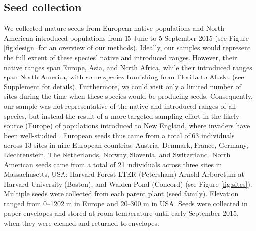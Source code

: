 \documentclass[11pt]{article}\usepackage[]{graphicx}\usepackage[]{color}
\begin{document}
	\subsection{Seed collection} 
	We collected mature seeds from European native populations and North American introduced populations from 15 June to 5 September 2015 (see Figure \ref{fig:design} for an overview of our methods).  Ideally, our samples would represent the full extent of these species' native and introduced ranges. However, their native ranges span Europe, Asia, and North Africa, while their introduced ranges span North America, with some species flourishing from Florida to Alaska (see Supplement for details). Furthermore, we could visit only a limited number of sites during the time when these species would be producing seeds. Consequently, our sample was not representative of the native and introduced ranges of all species, but instead the result of a more targeted sampling effort in the likely source (Europe) of populations introduced to New England, where invaders have been well-studied \parencite{Willis:2008bf}. European seeds thus came from a total of 63 individuals across 13 sites in nine European countries: Austria, Denmark, France, Germany, Liechtenstein, The Netherlands, Norway, Slovenia, and Switzerland.  North American seeds came from a total of 21 individuals across three sites  in Massachusetts, USA: Harvard Forest LTER (Petersham) Arnold Arboretum at Harvard University (Boston), and Walden Pond (Concord) (see Figure \ref{fig:sites}). Multiple seeds were collected from each parent plant (seed family). Elevation ranged from 0--1202 m in Europe and 20--300 m in USA. Seeds were collected in paper envelopes and stored at room temperature until early September 2015, when they were cleaned and returned to envelopes.  %
	
\end{document}
